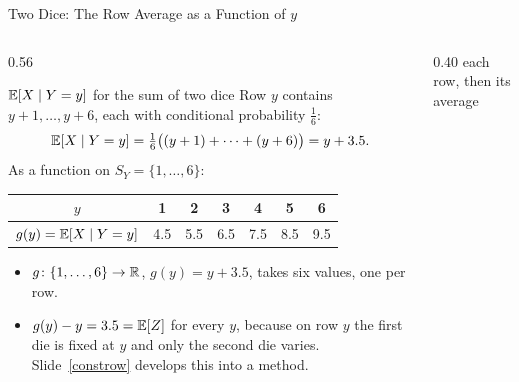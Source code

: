 \begin{frame}{Two Dice: The Row Average as a Function of $y$}
  \small
  \label{rowavg}%
  \begin{columns}[T]
    \begin{column}{0.56\textwidth}
      \begin{exampleblock}{$\mathbb{E}[X\mid Y=y]$ for the sum of two dice}
        Row $y$ contains $y+1,\dots,y+6$, each with conditional probability $\tfrac16$:
        \[
          \mathbb{E}[X\mid Y=y]=\tfrac16\big((y+1)+\dots+(y+6)\big)=y+3.5 .
        \]
        As a function on $S_Y=\{1,\dots,6\}$:\par\smallskip
        \centering
        \setlength{\tabcolsep}{4pt}
        \begin{tabular}{@{}c|cccccc@{}}
          $y$ & 1 & 2 & 3 & 4 & 5 & 6 \\ \hline
          $g(y)=\mathbb{E}[X\mid Y=y]$ & 4.5 & 5.5 & 6.5 & 7.5 & 8.5 & 9.5
        \end{tabular}
      \end{exampleblock}
      \begin{itemize}
        \item $g\colon\{1,\dots,6\}\to\mathbb{R}$, $g(y)=y+3.5$, takes six values, one per row.
        \item $g(y)-y=3.5=\mathbb{E}[Z]$ for every $y$, because on row $y$ the first die is fixed at $y$ and only the second die varies. Slide~\ref{constrow} develops this into a method.
      \end{itemize}
    \end{column}
    \begin{column}{0.40\textwidth}
      \centering
      each row, then its average\par\medskip
      \rowavgtable
    \end{column}
  \end{columns}
\end{frame}

